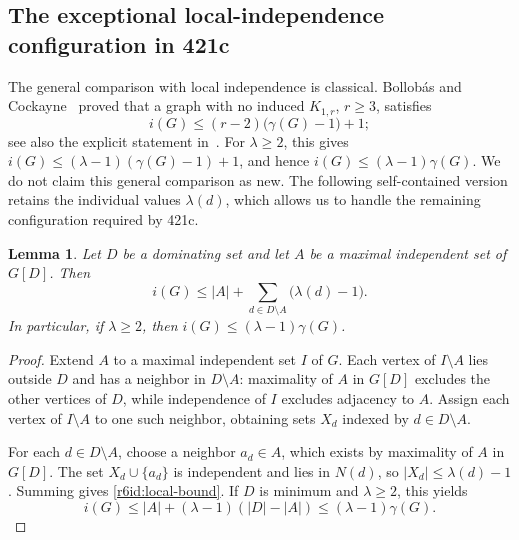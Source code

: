 \documentclass[11pt,a4paper]{article}
\newtheorem{lemma}[theorem]{Lemma}
\theoremstyle{remark}
\begin{document}
\subsection{The exceptional local-independence configuration in 421c}
\label{r6id:sub421c}

The general comparison with local independence is classical.
Bollob\'as and Cockayne~\cite{BC79} proved that a graph with no induced $K_{1,r}$,
$r\geq3$, satisfies
\[
 i(G)\leq(r-2)\bigl(\gamma(G)-1\bigr)+1;
\]
see also the explicit statement in~\cite[Theorem~1]{FK20}.
For $\lambda\geq2$, this gives
$i(G)\leq(\lambda-1)(\gamma(G)-1)+1$, and hence
$i(G)\leq(\lambda-1)\gamma(G)$.
We do not claim this general comparison as new.  The following
self-contained version retains the individual values $\lambda(d)$, which
allows us to handle the remaining configuration required by 421c.

\begin{lemma}\label{r6id:local-lemma}
Let $D$ be a dominating set and let $A$ be a maximal independent set of
$G[D]$.  Then
\begin{equation}\label{r6id:local-bound}
 i(G)\leq |A|+\sum_{d\in D\setminus A}\bigl(\lambda(d)-1\bigr).
\end{equation}
In particular, if $\lambda\geq2$, then
$i(G)\leq(\lambda-1)\gamma(G)$.
\end{lemma}
\begin{proof}
Extend $A$ to a maximal independent set $I$ of $G$.  Each vertex of
$I\setminus A$ lies outside $D$ and has a neighbor in $D\setminus A$:
maximality of $A$ in $G[D]$ excludes the other vertices of $D$, while
independence of $I$ excludes adjacency to $A$.  Assign each vertex of
$I\setminus A$ to one such neighbor, obtaining sets $X_d$ indexed by
$d\in D\setminus A$.

For each $d\in D\setminus A$, choose a neighbor $a_d\in A$, which exists
by maximality of $A$ in $G[D]$.  The set $X_d\cup\{a_d\}$ is independent
and lies in $N(d)$, so $|X_d|\leq\lambda(d)-1$.  Summing gives
\eqref{r6id:local-bound}.  If $D$ is minimum and $\lambda\geq2$, this yields
\[
 i(G)\leq |A|+(\lambda-1)(|D|-|A|)
       \leq(\lambda-1)\gamma(G).
\]
\end{proof}
\end{document}
